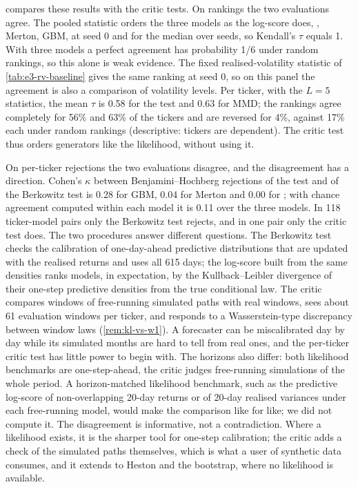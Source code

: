  compares these results with the critic tests. On rankings the two
evaluations agree. The pooled \WC{} statistic orders the three models as the log-score does,
\GARCHt{}, Merton, GBM, at seed 0 and for the median over seeds, so Kendall's $\tau$
\citep{kendall_1938_new} equals 1. With three models a perfect agreement has probability 1/6
under random rankings, so this alone is weak evidence. The fixed realised-volatility statistic of
\cref{tab:e3-rv-baseline} gives the same ranking at seed 0, so on this panel the agreement is
also a comparison of volatility levels. Per ticker, with the $L=5$ statistics, the
mean $\tau$ is 0.58 for the \WC{} test and 0.63 for MMD; the rankings agree completely for 56\%
and 63\% of the tickers and are reversed for 4\%, against 17\% each under random rankings
(descriptive: tickers are dependent). The critic test thus orders generators like the
likelihood, without using it.

On per-ticker rejections the two evaluations disagree, and the disagreement has a direction.
Cohen's $\kappa$ \citep{cohen_1960_coefficient} between Benjamini--Hochberg rejections of the
\WC{} test and of the Berkowitz test is 0.28 for GBM, 0.04 for Merton and 0.00 for \GARCHt{};
with chance agreement computed within each model it is 0.11 over the three models. In 118
ticker-model pairs only the Berkowitz test rejects, and in one pair only the critic test does.
The two procedures answer different questions. The Berkowitz test checks the calibration of
one-day-ahead predictive distributions that are updated with the realised \TEST{} returns and
uses all 615 days; the log-score built from the same densities ranks models, in expectation, by
the Kullback--Leibler divergence of their one-step predictive densities from the true conditional
law. The critic compares windows of free-running simulated paths with real windows, sees about 61
evaluation windows per ticker, and responds to a Wasserstein-type discrepancy between window laws
(\cref{rem:kl-vs-w1}). A forecaster can be miscalibrated day by
day while its simulated months are hard to tell from real ones, and the per-ticker critic test
has little power to begin with. The horizons also differ: both likelihood benchmarks are
one-step-ahead, the critic judges free-running simulations of the whole \TEST{} period. A
horizon-matched likelihood benchmark, such as the predictive log-score of non-overlapping 20-day
returns or of 20-day realised variances under each free-running model, would make the comparison
like for like; we did not compute it. The disagreement is informative, not a contradiction. Where a
likelihood exists, it is the sharper tool for one-step calibration; the critic adds a check of
the simulated paths themselves, which is what a user of synthetic data consumes, and it extends
to Heston and the bootstrap, where no likelihood is available.

